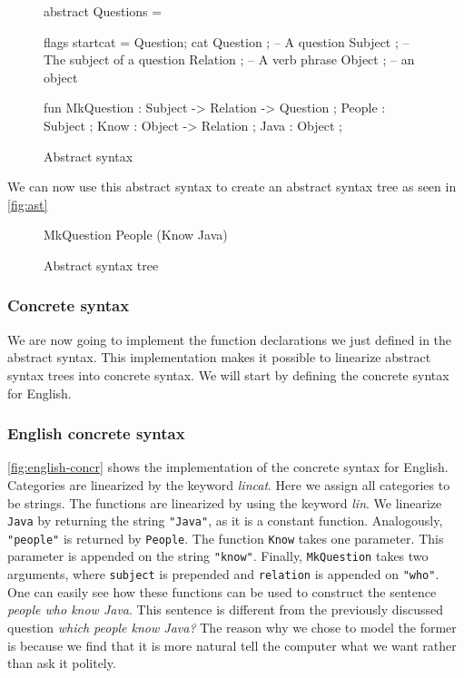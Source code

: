 \begin{figure}[h]
\begin{code}
abstract Questions = { 
  flags startcat = Question; 
  cat
    Question ; -- A question
    Subject ;  -- The subject of a question
    Relation ; -- A verb phrase
    Object ;   -- an object

  fun		 	  
    MkQuestion : Subject -> Relation -> Question ;
    People : Subject ;
    Know : Object -> Relation ;
    Java : Object ; 
}
\end{code}
\caption{Abstract syntax\label{fig:abstract-syntax}}
\end{figure}

We can now use this abstract syntax to create an abstract syntax tree as seen in \autoref{fig:ast}

\begin{figure}[h]
\begin{plaintext}
MkQuestion People (Know Java)
\end{plaintext}
\caption{Abstract syntax tree\label{fig:ast}}
\end{figure}

\subsubsection*{Concrete syntax}

We are now going to implement the function declarations we just defined in the abstract syntax. This implementation makes it possible to linearize abstract syntax trees into concrete syntax. We will start by defining the concrete syntax for English.

\subsubsection*{English concrete syntax}

\autoref{fig:english-concr} shows the implementation of the concrete syntax for English. Categories are linearized by the keyword \emph{lincat}. Here we assign all categories to be strings. The functions are linearized by using the keyword \emph{lin}. We linearize \texttt{Java} by returning the string \texttt{"Java"}, as it is a constant function. Analogously, \texttt{"people"} is returned by \texttt{People}. The function \texttt{Know} takes one parameter. This parameter is appended on the string \texttt{"know"}. Finally, \texttt{MkQuestion} takes two arguments, where \texttt{subject} is prepended and \texttt{relation} is appended on \texttt{"who"}. One can easily see how these functions can be used to construct the sentence \emph{people who know Java}. This sentence is different from the previously discussed question \emph{which people know Java?} The reason why we chose to model the former is because we find that it is more natural tell the computer what we want rather than ask it politely.

